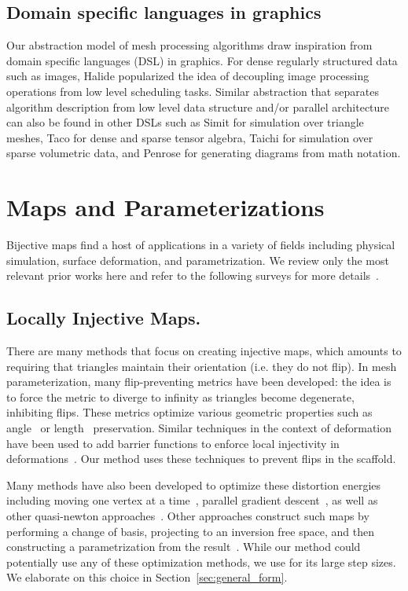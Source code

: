 \subsection{Domain specific languages in graphics}

Our abstraction model of mesh processing algorithms draw inspiration from domain
specific languages (DSL) in graphics.  For dense regularly structured data such
as images, Halide \cite{ragan2013halide} popularized the idea of decoupling image
processing operations from low level scheduling tasks. Similar abstraction that
separates algorithm description from low level data structure and/or parallel
architecture can also be found in other DSLs such as Simit
\cite{kjolstad2016simit} for simulation over triangle meshes, Taco
\cite{kjolstad2017taco} for dense and sparse tensor algebra, Taichi
\cite{hu2019taichi} for simulation over sparse volumetric data, and Penrose
\cite{ye2020penrose} for generating diagrams from math notation.


\section{Maps and Parameterizations}
Bijective maps find a host of applications in a variety of fields including physical simulation, surface deformation, and parametrization.  We review only the most relevant prior works here and refer to the following surveys for more details~\cite{FloaterSurvey:2005,Sheffer:2006,Hormann:2007}.

\subsection*{Locally Injective Maps.}
 There are many methods that focus on creating  injective maps, which amounts to requiring that triangles maintain their orientation (i.e. they do not flip). In mesh parameterization, many flip-preventing metrics have been developed: the idea is to force the metric to diverge to infinity as triangles become degenerate, inhibiting flips.  These metrics optimize various geometric properties such as angle~\cite{Hormann:2000,Degener:2003} or length~\cite{Sander:2001,Sorkine:2002,Aigerman:2014,Poranne:2014,Smith:2015} preservation.  Similar techniques in the context of deformation have been used to add barrier functions to enforce local injectivity in deformations~\cite{Schuller:2013}. Our method uses these techniques to prevent flips in the scaffold.

Many methods have also been developed to optimize these distortion energies including moving one vertex at a time~\cite{Hormann:2000}, parallel gradient descent~\cite{fu2015computing}, as well as other quasi-newton approaches~\cite{Smith:2015,Kovalsky:2016,rabinovich2017scalable}.  Other approaches construct such maps by performing a change of basis, projecting to an inversion free space, and then constructing a parametrization from the result~\cite{Fu:2016}. While our method could potentially use any of these optimization methods, we use \cite{rabinovich2017scalable} for its large step sizes. We elaborate on this choice in Section~\ref{sec:general_form}.

